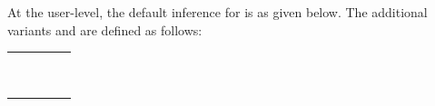 \begin{isabellebody}
\begin{isamarkuptext}
  At the user-level, the default inference for \hyperlink{command.assume}{\mbox{}} is
  \hyperlink{inference.discharge}{\mbox{}} as given below.  The additional variants
  \hyperlink{command.presume}{\mbox{}} and \hyperlink{command.def}{\mbox{}} are defined as follows:

  \medskip
  \begin{tabular}{rcl}
    \hyperlink{command.presume}{\mbox{\isa{\isacommand{presume}}}}~\isa{A} & \isa{{\isaliteral{22}{\isachardoublequote}}{\isaliteral{5C3C65717569763E}{\isasymequiv}}{\isaliteral{22}{\isachardoublequote}}} & \hyperlink{command.assume}{\mbox{\isa{\isacommand{assume}}}}~\isa{{\isaliteral{22}{\isachardoublequote}}{\isaliteral{5C3C6775696C6C656D6F746C6566743E}{\isasymguillemotleft}}weak{\isaliteral{5C3C68797068656E3E}{\isasymhyphen}}discharge{\isaliteral{5C3C6775696C6C656D6F7472696768743E}{\isasymguillemotright}}\ A{\isaliteral{22}{\isachardoublequote}}} \\
    \hyperlink{command.def}{\mbox{\isa{\isacommand{def}}}}~\isa{{\isaliteral{22}{\isachardoublequote}}x\ {\isaliteral{5C3C65717569763E}{\isasymequiv}}\ a{\isaliteral{22}{\isachardoublequote}}} & \isa{{\isaliteral{22}{\isachardoublequote}}{\isaliteral{5C3C65717569763E}{\isasymequiv}}{\isaliteral{22}{\isachardoublequote}}} & \hyperlink{command.fix}{\mbox{\isa{\isacommand{fix}}}}~\isa{x}~\hyperlink{command.assume}{\mbox{\isa{\isacommand{assume}}}}~\isa{{\isaliteral{22}{\isachardoublequote}}{\isaliteral{5C3C6775696C6C656D6F746C6566743E}{\isasymguillemotleft}}expansion{\isaliteral{5C3C6775696C6C656D6F7472696768743E}{\isasymguillemotright}}\ x\ {\isaliteral{5C3C65717569763E}{\isasymequiv}}\ a{\isaliteral{22}{\isachardoublequote}}} \\
  \end{tabular}
  \medskip


\end{isamarkuptext}
\end{isabellebody}
